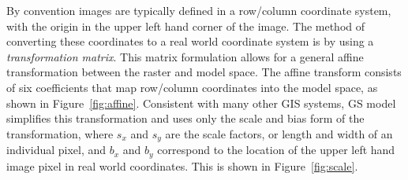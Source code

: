 \documentclass{ucdthesis}       %
\begin{document}
By convention images are typically defined in a row/column coordinate
system, with the origin in the upper left hand corner of the image.
The method of converting these coordinates to a real world coordinate
system is by using a \emph{transformation matrix}.  This matrix
formulation allows for a general affine transformation between the
raster and model space.  The affine transform consists of six
coefficients that map row/column coordinates into the model space, as
shown in Figure~\ref{fig:affine}.  Consistent with many other \ac{GIS}
systems, \ac{GS} model simplifies this transformation and uses only
the scale and bias form of the transformation, where $s_x$ and $s_y$
are the scale factors, or length and width of an individual pixel, and
$b_x$ and $b_y$ correspond to the location of the upper left hand
image pixel in real world coordinates.  This is shown in
Figure~\ref{fig:scale}.
\end{document}
